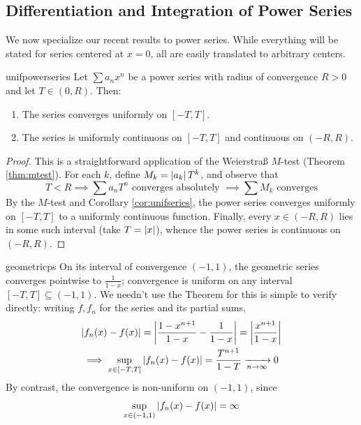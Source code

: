 \goodbreak



\subsection{Differentiation and Integration of Power Series}\label{sec:diffintpower}

We now specialize our recent results to power series. While everything will be stated for series centered at $x=0$, all are easily translated to arbitrary centers.

\begin{thm}{}{unifpowerseries}
	Let $\sum a_nx^n$ be a power series with radius of convergence $R>0$ and let $T\in(0,R)$. Then:
	\begin{enumerate}
	  \item The series converges uniformly on $[-T,T]$.
	  \item The series is uniformly continuous on $[-T,T]$ and continuous on $(-R,R)$.
	\end{enumerate} 
\end{thm}


\begin{proof}
	This is a straightforward application of the Weierstraß $M$-test (Theorem \ref{thm:mtest}). For each $k$, define $M_k=\left| a_k\right|T^k$, and observe that
	\[
		T<R\implies \sum a_nT^n\text{ converges absolutely }\implies \sum M_k\text{ converges}
	\]
	By the $M$-test and Corollary \ref{cor:unifseries}, the power series converges uniformly on $[-T,T]$ to a uniformly continuous function.
	\medbreak
	Finally, every $x\in(-R,R)$ lies in some such interval (take $T=\left| x\right|$), whence the power series is continuous on $(-R,R)$.
\end{proof}

\begin{example}{}{geometricps}
	On its interval of convergence $(-1,1)$, the geometric series  converges pointwise to $\frac 1{1-x}$; convergence is uniform on any interval $[-T,T]\subseteq(-1,1)$.
	\smallbreak
	We needn't use the Theorem for this is simple to verify directly: writing $f,f_n$ for the series and its partial sums,
	\begin{gather*}
		\left| f_n(x)-f(x)\right|=\left| \frac{1-x^{n+1}}{1-x}-\frac 1{1-x}\right|
		=\left| \frac{x^{n+1}}{1-x}\right|\\
		\implies \sup_{x\in [-T,T]}\left| f_n(x)-f(x)\right|
		=\frac{T^{n+1}}{1-T} \xrightarrow[n\to\infty]{} 0
	\end{gather*}
	\smallbreak
	By contrast, the convergence is non-uniform on $(-1,1)$, since
	\[
		\sup_{x\in(-1,1)}\left| f_n(x)-f(x)\right|=\infty
	\]
\end{example}



